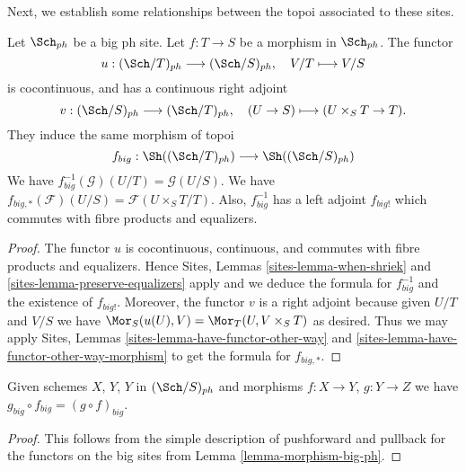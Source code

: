 \noindent
Next, we establish some relationships between the topoi
associated to these sites.

\begin{lemma}
\label{lemma-morphism-big-ph}
Let $\Sch_{ph}$ be a big ph site.
Let $f : T \to S$ be a morphism in $\Sch_{ph}$.
The functor
$$
u : (\Sch/T)_{ph} \longrightarrow (\Sch/S)_{ph},
\quad
V/T \longmapsto V/S
$$
is cocontinuous, and has a continuous right adjoint
$$
v : (\Sch/S)_{ph} \longrightarrow (\Sch/T)_{ph},
\quad
(U \to S) \longmapsto (U \times_S T \to T).
$$
They induce the same morphism of topoi
$$
f_{big} :
\Sh((\Sch/T)_{ph})
\longrightarrow
\Sh((\Sch/S)_{ph})
$$
We have $f_{big}^{-1}(\mathcal{G})(U/T) = \mathcal{G}(U/S)$.
We have $f_{big, *}(\mathcal{F})(U/S) = \mathcal{F}(U \times_S T/T)$.
Also, $f_{big}^{-1}$ has a left adjoint $f_{big!}$ which commutes with
fibre products and equalizers.
\end{lemma}

\begin{proof}
The functor $u$ is cocontinuous, continuous, and commutes with fibre products
and equalizers. Hence
Sites, Lemmas \ref{sites-lemma-when-shriek} and
\ref{sites-lemma-preserve-equalizers}
apply and we deduce the formula
for $f_{big}^{-1}$ and the existence of $f_{big!}$. Moreover,
the functor $v$ is a right adjoint because given $U/T$ and $V/S$
we have $\Mor_S(u(U), V) = \Mor_T(U, V \times_S T)$
as desired. Thus we may apply
Sites, Lemmas \ref{sites-lemma-have-functor-other-way} and
\ref{sites-lemma-have-functor-other-way-morphism} to get the
formula for $f_{big, *}$.
\end{proof}

\begin{lemma}
\label{lemma-composition-ph}
Given schemes $X$, $Y$, $Y$ in $(\Sch/S)_{ph}$
and morphisms $f : X \to Y$, $g : Y \to Z$ we have
$g_{big} \circ f_{big} = (g \circ f)_{big}$.
\end{lemma}

\begin{proof}
This follows from the simple description of pushforward
and pullback for the functors on the big sites from
Lemma \ref{lemma-morphism-big-ph}.
\end{proof}



































